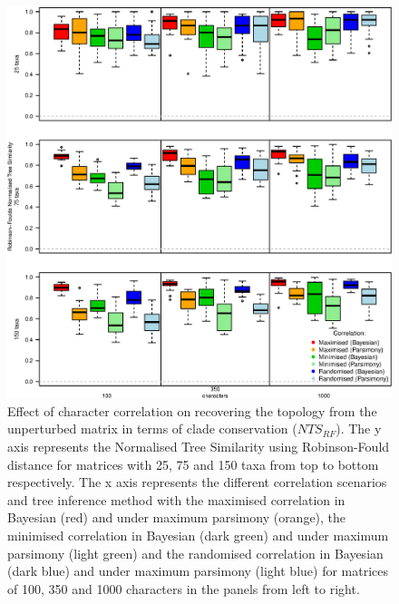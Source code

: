 \documentclass[12pt,letterpaper]{article}
\begin{document}
\begin{figure}[!htbp]
\centering
   \includegraphics[width=1\textwidth]{RF_results_best.eps}
\caption{\small{Effect of character correlation on recovering the topology from the unperturbed matrix in terms of clade conservation ($NTS_{RF}$). The y axis represents the Normalised Tree Similarity using Robinson-Fould distance for matrices with 25, 75 and 150 taxa from top to bottom respectively. The x axis represents the different correlation scenarios and tree inference method with the maximised correlation in Bayesian (red) and under maximum parsimony (orange), the minimised correlation in Bayesian (dark green) and under maximum parsimony (light green) and the randomised correlation in Bayesian (dark blue) and under maximum parsimony (light blue) for matrices of 100, 350 and 1000 characters in the panels from left to right.}}
\label{Fig:RF_results_best}
\end{figure}
\end{document}
